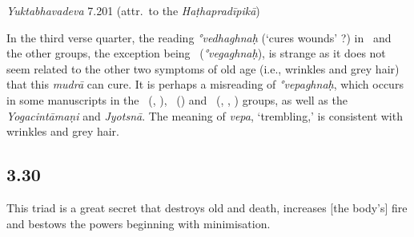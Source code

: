 \begin{ekdosis}
\begin{testimonia}[hp03_029]
\emph{Yuktabhavadeva} 7.201 (attr.~to the \emph{Haṭhapradīpikā})
\begin{versinnote}
\end{versinnote}

\end{testimonia}

\begin{philcomm}[hp03_029]
In the third verse quarter, the reading \emph{°vedhaghnaḥ} (`cures wounds' ?) in \textalpha\ and the other groups, the exception being \textgamma\ (\emph{°vegaghnaḥ}), is strange as it does not seem related to the other two symptoms of old age (i.e., wrinkles and grey hair) that this \emph{mudrā} can cure. It is perhaps a misreading of \emph{°vepaghnaḥ}, which occurs in some manuscripts in the \textbeta\ (, ), \textepsilon\ () and \textdelta\ (, , ) groups, as well as the \emph{Yogacintāmaṇi} and \emph{Jyotsnā}. The meaning of \emph{vepa}, `trembling,' is consistent with wrinkles and grey hair.

\end{philcomm}

\subsection*{3.30}
\begin{translation}[hp03_030]
This triad is a great secret that destroys old and death, increases [the body's] fire and bestows the powers beginning with minimisation.
\end{translation}


\end{ekdosis}
